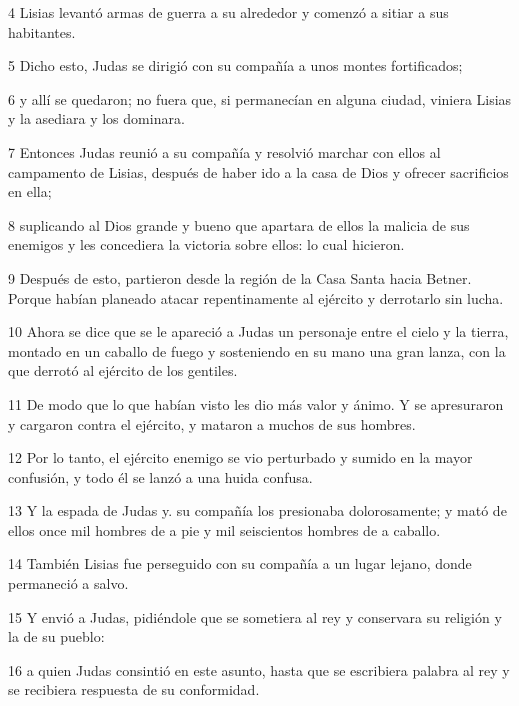 \par 4 Lisias levantó armas de guerra a su alrededor y comenzó a sitiar a sus habitantes.

\par 5 Dicho esto, Judas se dirigió con su compañía a unos montes fortificados;

\par 6 y allí se quedaron; no fuera que, si permanecían en alguna ciudad, viniera Lisias y la asediara y los dominara.

\par 7 Entonces Judas reunió a su compañía y resolvió marchar con ellos al campamento de Lisias, después de haber ido a la casa de Dios y ofrecer sacrificios en ella;

\par 8 suplicando al Dios grande y bueno que apartara de ellos la malicia de sus enemigos y les concediera la victoria sobre ellos: lo cual hicieron.

\par 9 Después de esto, partieron desde la región de la Casa Santa hacia Betner. Porque habían planeado atacar repentinamente al ejército y derrotarlo sin lucha.

\par 10 Ahora se dice que se le apareció a Judas un personaje entre el cielo y la tierra, montado en un caballo de fuego y sosteniendo en su mano una gran lanza, con la que derrotó al ejército de los gentiles.

\par 11 De modo que lo que habían visto les dio más valor y ánimo. Y se apresuraron y cargaron contra el ejército, y mataron a muchos de sus hombres.

\par 12 Por lo tanto, el ejército enemigo se vio perturbado y sumido en la mayor confusión, y todo él se lanzó a una huida confusa.

\par 13 Y la espada de Judas y. su compañía los presionaba dolorosamente; y mató de ellos once mil hombres de a pie y mil seiscientos hombres de a caballo.

\par 14 También Lisias fue perseguido con su compañía a un lugar lejano, donde permaneció a salvo.

\par 15 Y envió a Judas, pidiéndole que se sometiera al rey y conservara su religión y la de su pueblo:

\par 16 a quien Judas consintió en este asunto, hasta que se escribiera palabra al rey y se recibiera respuesta de su conformidad.

